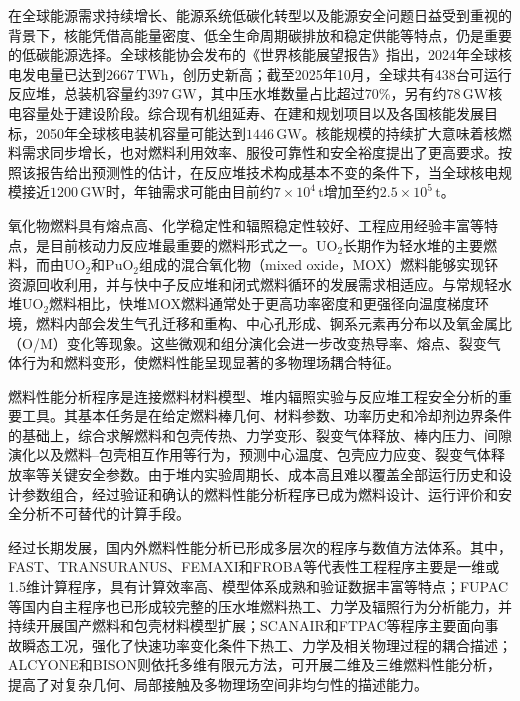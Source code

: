 


在全球能源需求持续增长、能源系统低碳化转型以及能源安全问题日益受到重视的背景下，核能凭借高能量密度、低全生命周期碳排放和稳定供能等特点，仍是重要的低碳能源选择。全球核能协会发布的《世界核能展望报告》指出，2024年全球核电发电量已达到$2667\,\mathrm{TWh}$，创历史新高；截至2025年10月，全球共有438台可运行反应堆，总装机容量约$397\,\mathrm{GW}$，其中压水堆数量占比超过70\%，另有约$78\,\mathrm{GW}$核电容量处于建设阶段。综合现有机组延寿、在建和规划项目以及各国核能发展目标，2050年全球核电装机容量可能达到$1446\,\mathrm{GW}$\cite{worldnuclearassociationWorldNuclearEnergy2026}。核能规模的持续扩大意味着核燃料需求同步增长，也对燃料利用效率、服役可靠性和安全裕度提出了更高要求。按照该报告给出预测性的估计，在反应堆技术构成基本不变的条件下，当全球核电规模接近$1200\,\mathrm{GW}$时，年铀需求可能由目前约$7\times10^4\,\mathrm{t}$增加至约$2.5\times10^5\,\mathrm{t}$\cite{worldnuclearassociationWorldNuclearEnergy2026}。

氧化物燃料具有熔点高、化学稳定性和辐照稳定性较好、工程应用经验丰富等特点，是目前核动力反应堆最重要的燃料形式之一。UO$_2$长期作为轻水堆的主要燃料，而由UO$_2$和PuO$_2$组成的混合氧化物（mixed oxide，MOX）燃料能够实现钚资源回收利用，并与快中子反应堆和闭式燃料循环的发展需求相适应\cite{parrishReviewMicrostructuralFeatures2018}。与常规轻水堆UO$_2$燃料相比，快堆MOX燃料通常处于更高功率密度和更强径向温度梯度环境，燃料内部会发生气孔迁移和重构、中心孔形成、锕系元素再分布以及氧金属比（O/M）变化等现象。这些微观和组分演化会进一步改变热导率、熔点、裂变气体行为和燃料变形，使燃料性能呈现显著的多物理场耦合特征\cite{parrishReviewMicrostructuralFeatures2018,boberPlutoniumRedistributionFast1973}。

燃料性能分析程序是连接燃料材料模型、堆内辐照实验与反应堆工程安全分析的重要工具。其基本任务是在给定燃料棒几何、材料参数、功率历史和冷却剂边界条件的基础上，综合求解燃料和包壳传热、力学变形、裂变气体释放、棒内压力、间隙演化以及燃料--包壳相互作用等行为，预测中心温度、包壳应力应变、裂变气体释放率等关键安全参数\cite{vanuffelenReviewFuelPerformance2019}。由于堆内实验周期长、成本高且难以覆盖全部运行历史和设计参数组合，经过验证和确认的燃料性能分析程序已成为燃料设计、运行评价和安全分析不可替代的计算手段。

经过长期发展，国内外燃料性能分析已形成多层次的程序与数值方法体系。其中，FAST、TRANSURANUS、FEMAXI和FROBA等代表性工程程序主要是一维或1.5维计算程序，具有计算效率高、模型体系成熟和验证数据丰富等特点\cite{porterFAST10Computer2020,lassmannTRANSURANUSFuelRod1992,udagawaModelUpdatesFEMAXI2019,yuDevelopmentFuelROd2012,liaoModificationUpdateFROBA2019}；FUPAC等国内自主程序也已形成较完整的压水堆燃料热工、力学及辐照行为分析能力，并持续开展国产燃料和包壳材料模型扩展\cite{xingFuelRodAnalysis2021}；SCANAIR和FTPAC等程序主要面向事故瞬态工况，强化了快速功率变化条件下热工、力学及相关物理过程的耦合描述\cite{moalSCANAIRTransientFuel2014,hanValidationApplicationFTPAC2014}；ALCYONE和BISON则依托多维有限元方法，可开展二维及三维燃料性能分析，提高了对复杂几何、局部接触及多物理场空间非均匀性的描述能力\cite{introiniALCYONEFuelPerformance2024,williamsonBISONFlexibleCode2021}。

